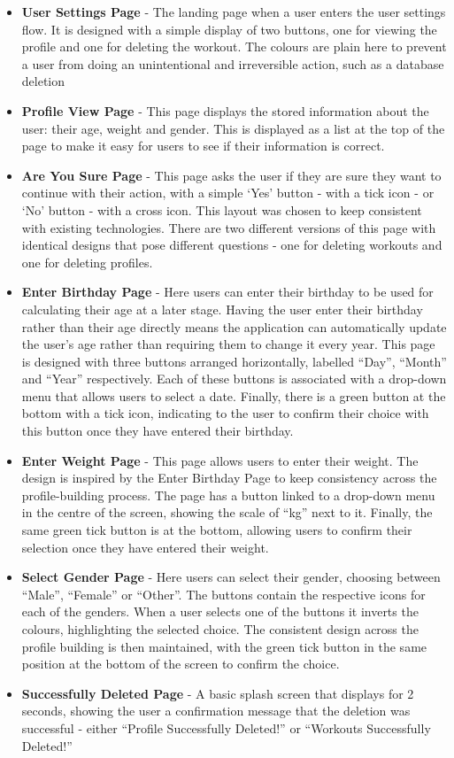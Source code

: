 \documentclass{l4proj}
\begin{document}
\begin{itemize}
    \item \textbf{User Settings Page} - The landing page when a user enters the user settings flow. It is designed with a simple display of two buttons, one for viewing the profile and one for deleting the workout. The colours are plain here to prevent a user from doing an unintentional and irreversible action, such as a database deletion
    \item \textbf{Profile View Page} - This page displays the stored information about the user: their age, weight and gender. This is displayed as a list at the top of the page to make it easy for users to see if their information is correct.
    \item \textbf{Are You Sure Page} - This page asks the user if they are sure they want to continue with their action, with a simple ‘Yes’ button - with a tick icon - or ‘No’ button - with a cross icon. This layout was chosen to keep consistent with existing technologies. There are two different versions of this page with identical designs that pose different questions - one for deleting workouts and one for deleting profiles.
    \item \textbf{Enter Birthday Page} - Here users can enter their birthday to be used for calculating their age at a later stage. Having the user enter their birthday rather than their age directly means the application can automatically update the user’s age rather than requiring them to change it every year. This page is designed with three buttons arranged horizontally, labelled “Day”, “Month” and “Year” respectively. Each of these buttons is associated with a drop-down menu that allows users to select a date. Finally, there is a green button at the bottom with a tick icon, indicating to the user to confirm their choice with this button once they have entered their birthday.
    \item \textbf{Enter Weight Page} - This page allows users to enter their weight. The design is inspired by the Enter Birthday Page to keep consistency across the profile-building process. The page has a button linked to a drop-down menu in the centre of the screen, showing the scale of “kg” next to it. Finally, the same green tick button is at the bottom, allowing users to confirm their selection once they have entered their weight.
    \item \textbf{Select Gender Page} - Here users can select their gender, choosing between “Male”, “Female” or “Other”. The buttons contain the respective icons for each of the genders. When a user selects one of the buttons it inverts the colours, highlighting the selected choice. The consistent design across the profile building is then maintained, with the green tick button in the same position at the bottom of the screen to confirm the choice.
    \item \textbf{Successfully Deleted Page} - A basic splash screen that displays for 2 seconds, showing the user a confirmation message that the deletion was successful - either “Profile Successfully Deleted!” or “Workouts Successfully Deleted!”
\end{itemize}
\end{document}
